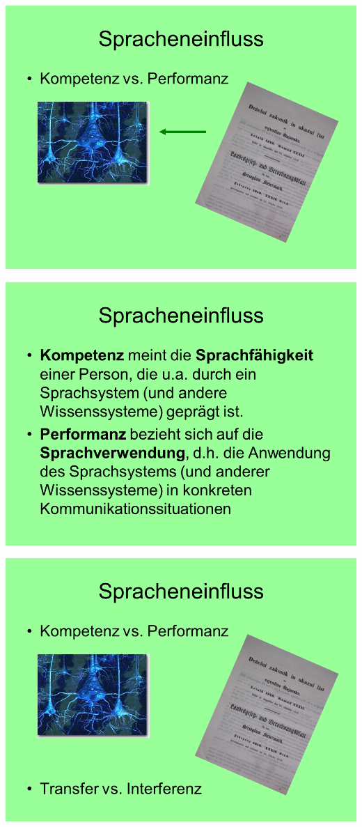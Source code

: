 \documentclass[
  letterpaper,
]{scrbook}
\begin{document}
\includegraphics[width=1\textwidth,height=\textheight]{./pictures/02_Spracheneinfluss_Sprachentrennung/Diapozitiv14.PNG}

\includegraphics[width=1\textwidth,height=\textheight]{./pictures/02_Spracheneinfluss_Sprachentrennung/Diapozitiv15.PNG}

\includegraphics[width=1\textwidth,height=\textheight]{./pictures/02_Spracheneinfluss_Sprachentrennung/Diapozitiv16.PNG}
\end{document}
